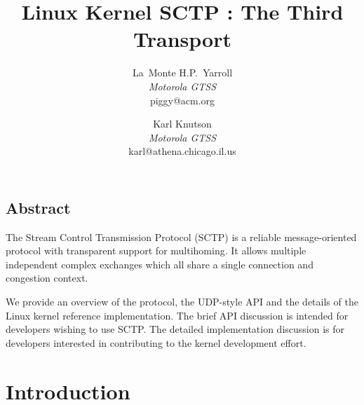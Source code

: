 \documentclass[twocolumn]{article}
\begin{document}

\date{}

\title{\Large \bf Linux Kernel SCTP : The Third Transport}

\author{
La~Monte H.P.\ Yarroll \\
{\em Motorola GTSS}\\
{\normalsize piggy@acm.org} \\
%
\and
Karl Knutson \\
{\em Motorola GTSS}\\
{\normalsize karl@athena.chicago.il.us}
%
} %

\maketitle

\thispagestyle{empty}
\renewcommand{\thefootnote}{\fnsymbol{footnote}}

\subsection*{Abstract}

The Stream Control Transmission Protocol (SCTP) is a reliable
message-oriented protocol with transparent support for multihoming.
It allows multiple independent complex exchanges which all share a
single connection and congestion context.

We provide an overview of the protocol, the UDP-style API and the
details of the Linux kernel reference implementation.  The brief API
discussion is intended for developers wishing to use SCTP.  The
detailed implementation discussion is for developers interested in
contributing to the kernel development effort.

\section{Introduction}
\end{document}
